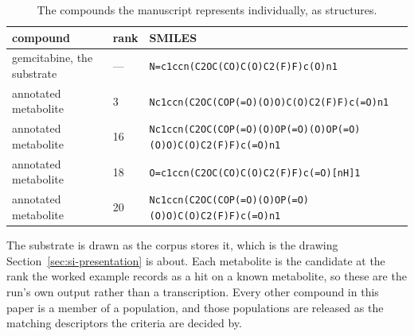 \begin{table}[h]
\centering\scriptsize
\begin{threeparttable}
\caption{The compounds the manuscript represents individually, as structures.}
\label{tab:si-worked-structures}
\begin{tabular}{@{}llp{}@{}}
\toprule
compound & rank & SMILES \\
\midrule
gemcitabine, the substrate & --- & \texttt{N=\allowbreak{}c1ccn(\allowbreak{}C2OC(\allowbreak{}CO)\allowbreak{}C(\allowbreak{}O)\allowbreak{}C2(\allowbreak{}F)\allowbreak{}F)\allowbreak{}c(\allowbreak{}O)\allowbreak{}n1} \\
annotated metabolite & 3 & \texttt{Nc1ccn(\allowbreak{}C2OC(\allowbreak{}COP(\allowbreak{}=\allowbreak{}O)\allowbreak{}(\allowbreak{}O)\allowbreak{}O)\allowbreak{}C(\allowbreak{}O)\allowbreak{}C2(\allowbreak{}F)\allowbreak{}F)\allowbreak{}c(\allowbreak{}=\allowbreak{}O)\allowbreak{}n1} \\
annotated metabolite & 16 & \texttt{Nc1ccn(\allowbreak{}C2OC(\allowbreak{}COP(\allowbreak{}=\allowbreak{}O)\allowbreak{}(\allowbreak{}O)\allowbreak{}OP(\allowbreak{}=\allowbreak{}O)\allowbreak{}(\allowbreak{}O)\allowbreak{}OP(\allowbreak{}=\allowbreak{}O)\allowbreak{}(\allowbreak{}O)\allowbreak{}O)\allowbreak{}C(\allowbreak{}O)\allowbreak{}C2(\allowbreak{}F)\allowbreak{}F)\allowbreak{}c(\allowbreak{}=\allowbreak{}O)\allowbreak{}n1} \\
annotated metabolite & 18 & \texttt{O=\allowbreak{}c1ccn(\allowbreak{}C2OC(\allowbreak{}CO)\allowbreak{}C(\allowbreak{}O)\allowbreak{}C2(\allowbreak{}F)\allowbreak{}F)\allowbreak{}c(\allowbreak{}=\allowbreak{}O)\allowbreak{}[nH]1} \\
annotated metabolite & 20 & \texttt{Nc1ccn(\allowbreak{}C2OC(\allowbreak{}COP(\allowbreak{}=\allowbreak{}O)\allowbreak{}(\allowbreak{}O)\allowbreak{}OP(\allowbreak{}=\allowbreak{}O)\allowbreak{}(\allowbreak{}O)\allowbreak{}O)\allowbreak{}C(\allowbreak{}O)\allowbreak{}C2(\allowbreak{}F)\allowbreak{}F)\allowbreak{}c(\allowbreak{}=\allowbreak{}O)\allowbreak{}n1} \\
\bottomrule
\end{tabular}
\begin{tablenotes}[flushleft]\footnotesize
\item The substrate is drawn as the corpus stores it, which is the drawing Section~\ref{sec:si-presentation} is about. Each metabolite is the candidate at the rank the worked example records as a hit on a known metabolite, so these are the run's own output rather than a transcription. Every other compound in this paper is a member of a population, and those populations are released as the matching descriptors the criteria are decided by.
\end{tablenotes}
\end{threeparttable}
\end{table}
